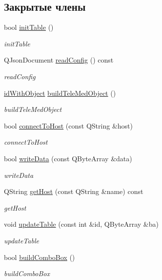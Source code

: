 \subsection*{Закрытые члены}
\begin{DoxyCompactItemize}
\item 
bool \hyperlink{classSendDialog_a479b0de26c1b97fa47ffcbd67252da1f}{init\+Table} ()
\begin{DoxyCompactList}\small\item\em init\+Table \end{DoxyCompactList}\item 
Q\+Json\+Document \hyperlink{classSendDialog_a26dea1897c6af47118f88e89fcc0a7f1}{read\+Config} () const
\begin{DoxyCompactList}\small\item\em read\+Config \end{DoxyCompactList}\item 
\hyperlink{senddialog_8h_aa9b1321518febdee7323e4994ecc1ec3}{id\+With\+Object} \hyperlink{classSendDialog_a7b74a8f29ac1cd411195fb9d9f48cd44}{build\+Tele\+Med\+Object} ()
\begin{DoxyCompactList}\small\item\em build\+Tele\+Med\+Object \end{DoxyCompactList}\item 
bool \hyperlink{classSendDialog_a0bde13a7efe3bd50e9fe67a7b87b9f2c}{connect\+To\+Host} (const Q\+String \&host)
\begin{DoxyCompactList}\small\item\em connect\+To\+Host \end{DoxyCompactList}\item 
bool \hyperlink{classSendDialog_a2942d10e361268fb72c55fa158c57a83}{write\+Data} (const Q\+Byte\+Array \&data)
\begin{DoxyCompactList}\small\item\em write\+Data \end{DoxyCompactList}\item 
Q\+String \hyperlink{classSendDialog_af8fc97ec266db98d488701a4601f1b26}{get\+Host} (const Q\+String \&name) const
\begin{DoxyCompactList}\small\item\em get\+Host \end{DoxyCompactList}\item 
void \hyperlink{classSendDialog_a2bea7a847533969d7a3ff885d6aff656}{update\+Table} (const int \&id, Q\+Byte\+Array \&ba)
\begin{DoxyCompactList}\small\item\em update\+Table \end{DoxyCompactList}\item 
bool \hyperlink{classSendDialog_a6da8a7a2736bad8f3da4d6d8e1608f3d}{build\+Combo\+Box} ()
\begin{DoxyCompactList}\small\item\em build\+Combo\+Box \end{DoxyCompactList}\end{DoxyCompactItemize}
